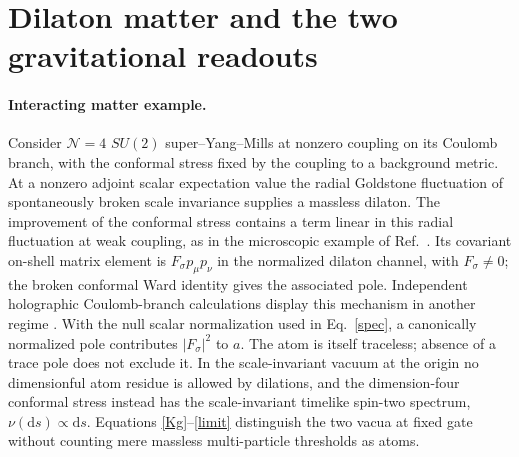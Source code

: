\documentclass[11pt]{article}
\newcommand{\dd}{\mathrm d}
\begin{document}
\section{Dilaton matter and the two gravitational readouts}

\paragraph{Interacting matter example.}
Consider \(\mathcal N=4\) \(SU(2)\) super--Yang--Mills at nonzero coupling on its Coulomb branch, with the conformal stress fixed by the coupling to a background metric. At a nonzero adjoint scalar expectation value the radial Goldstone fluctuation of spontaneously broken scale invariance supplies a massless dilaton. The improvement of the conformal stress contains a term linear in this radial fluctuation at weak coupling, as in the microscopic example of Ref.~\cite[Sec.~2]{ST}. Its covariant on-shell matrix element is \(F_\sigma p_\mu p_\nu\) in the normalized dilaton channel, with \(F_\sigma\ne0\); the broken conformal Ward identity gives the associated pole. Independent holographic Coulomb-branch calculations display this mechanism in another regime \cite{BFS}. With the null scalar normalization used in Eq.~\eqref{spec}, a canonically normalized pole contributes \(|F_\sigma|^2\) to \(a\). The atom is itself traceless; absence of a trace pole does not exclude it. In the scale-invariant vacuum at the origin no dimensionful atom residue is allowed by dilations, and the dimension-four conformal stress instead has the scale-invariant timelike spin-two spectrum, \(\nu(\dd s)\propto\dd s\). Equations \eqref{Kg}--\eqref{limit} distinguish the two vacua at fixed gate without counting mere massless multi-particle thresholds as atoms.
\end{document}
